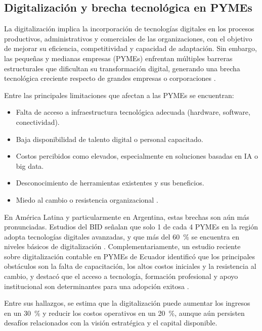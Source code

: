 \subsection{Digitalización y brecha tecnológica en PYMEs}

La digitalización implica la incorporación de tecnologías digitales en los procesos productivos, administrativos y comerciales de las organizaciones, con el objetivo de mejorar su eficiencia, competitividad y capacidad de adaptación. Sin embargo, las pequeñas y medianas empresas (PYMEs) enfrentan múltiples barreras estructurales que dificultan su transformación digital, generando una brecha tecnológica creciente respecto de grandes empresas o corporaciones \parencite{oecd2021}.

Entre las principales limitaciones que afectan a las PYMEs se encuentran:

\begin{itemize}
    \item Falta de acceso a infraestructura tecnológica adecuada (hardware, software, conectividad).
    \item Baja disponibilidad de talento digital o personal capacitado.
    \item Costos percibidos como elevados, especialmente en soluciones basadas en IA o big data.
    \item Desconocimiento de herramientas existentes y sus beneficios.
    \item Miedo al cambio o resistencia organizacional \parencite{jordao2022}.
\end{itemize}

En América Latina y particularmente en Argentina, estas brechas son aún más pronunciadas. Estudios del BID señalan que solo 1 de cada 4 PYMEs en la región adopta tecnologías digitales avanzadas, y que más del 60~\% se encuentra en niveles básicos de digitalización \parencite{bid2020}. Complementariamente, un estudio reciente sobre digitalización contable en PYMEs de Ecuador identificó que los principales obstáculos son la falta de capacitación, los altos costos iniciales y la resistencia al cambio, y destacó que el acceso a tecnología, formación profesional y apoyo institucional son determinantes para una adopción exitosa \parencite{vasconez2025}.

Entre sus hallazgos, se estima que la digitalización puede aumentar los ingresos en un 30~\% y reducir los costos operativos en un 20~\%, aunque aún persisten desafíos relacionados con la visión estratégica y el capital disponible.


